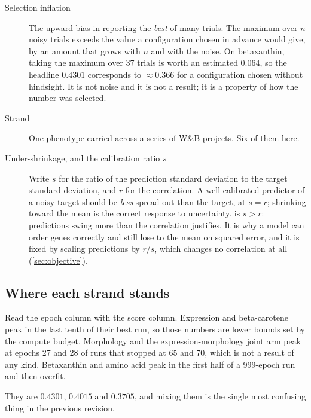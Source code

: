 \begin{description}
\item[Selection inflation] The upward bias in reporting the \emph{best} of many trials. The
  maximum over $n$ noisy trials exceeds the value a configuration chosen in advance would
  give, by an amount that grows with $n$ and with the noise. On betaxanthin, taking the
  maximum over 37 trials is worth an estimated $0.064$, so the headline $0.4301$ corresponds
  to $\approx 0.366$ for a configuration chosen without hindsight. It is not noise and it is
  not a result; it is a property of how the number was selected.

\item[Strand] One phenotype carried across a series of W\&B projects. Six of them here.

\item[Under-shrinkage, and the calibration ratio $s$] Write $s$ for the ratio of the
  prediction standard deviation to the target standard deviation, and $r$ for the
  correlation. A well-calibrated predictor of a noisy target should be \emph{less} spread out
  than the target, at $s = r$; shrinking toward the mean is the correct response to
  uncertainty.  is $s > r$: predictions swing more than the
  correlation justifies. It is why a model can order genes correctly and still lose to the
  mean on squared error, and it is fixed by scaling predictions by $r/s$, which changes no
  correlation at all (\cref{sec:objective}).
\end{description}

\subsection{Where each strand stands}



Read the epoch column with the score column. Expression and beta-carotene peak in the last
tenth of their best run, so those numbers are lower bounds set by the compute budget.
Morphology and the expression-morphology joint arm peak at epochs 27 and 28 of runs that
stopped at 65 and 70, which is not a result of any kind. Betaxanthin and amino acid peak in
the first half of a 999-epoch run and then overfit.

 They are
$0.4301$, $0.4015$ and $0.3705$, and mixing them is the single most confusing thing in the
previous revision.

